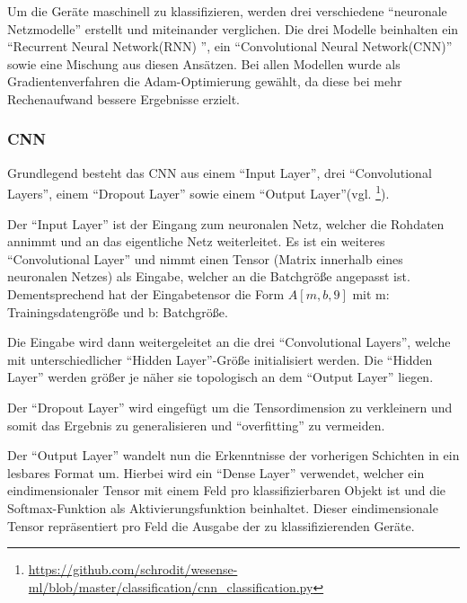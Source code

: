    \noindent
    Um die Geräte maschinell zu klassifizieren, werden drei verschiedene "`neuronale Netzmodelle"' erstellt und miteinander verglichen.
    Die drei Modelle beinhalten ein "`Recurrent Neural Network(RNN) "', ein "`Convolutional Neural Network(CNN)"' sowie eine Mischung aus diesen Ansätzen. 
    Bei allen Modellen wurde als Gradientenverfahren die Adam-Optimierung gewählt, da diese bei mehr Rechenaufwand bessere Ergebnisse erzielt.    

    \subsubsection{CNN}
    Grundlegend besteht das \ac{CNN} aus einem "`Input Layer"', drei "`Convolutional Layers"', einem "`Dropout Layer"' sowie einem "`Output Layer"'(vgl. \footnote{\url{https://github.com/schrodit/wesense-ml/blob/master/classification/cnn_classification.py}}).
    \newline

    \noindent
    Der "`Input Layer"' ist der Eingang zum neuronalen Netz, welcher die Rohdaten annimmt und an das eigentliche Netz weiterleitet. 
    Es ist ein weiteres "`Convolutional Layer"' und nimmt einen Tensor (Matrix innerhalb eines neuronalen Netzes) als Eingabe, welcher an die Batchgröße angepasst ist.
    Dementsprechend hat der Eingabetensor die Form \( A[m, b, 9] \) mit m: Trainingsdatengröße und b: Batchgröße.
    \newline

    \noindent
    Die Eingabe wird dann weitergeleitet an die drei "`Convolutional Layers"', welche mit unterschiedlicher "`Hidden Layer"'-Größe initialisiert werden.
    Die "`Hidden Layer"' werden größer je näher sie topologisch an dem "`Output Layer"' liegen.
    \newline

    \noindent
    Der "`Dropout Layer"' wird eingefügt um die Tensordimension zu verkleinern und somit das Ergebnis zu generalisieren und "`overfitting"' zu vermeiden.
    \newline

    \noindent
    Der "`Output Layer"' wandelt nun die Erkenntnisse der vorherigen Schichten in ein lesbares Format um. 
    Hierbei wird ein "`Dense Layer"' verwendet, welcher ein eindimensionaler Tensor mit einem Feld pro klassifizierbaren Objekt ist und die Softmax-Funktion als Aktivierungsfunktion beinhaltet.
    Dieser eindimensionale Tensor repräsentiert pro Feld die Ausgabe der zu klassifizierenden Geräte.     
    

